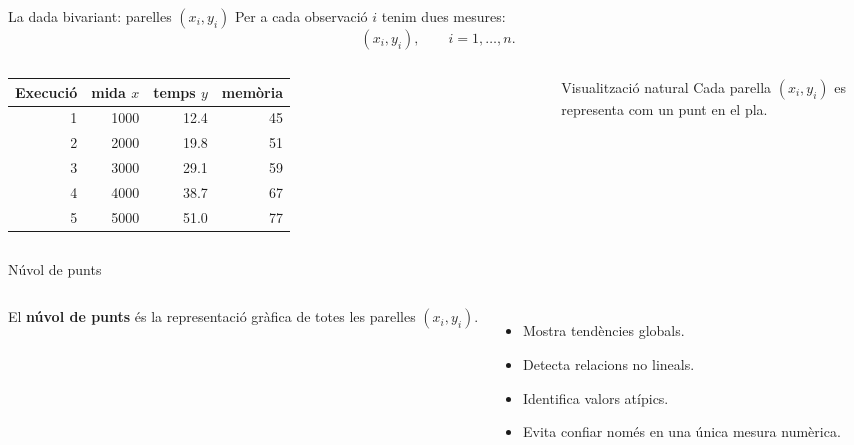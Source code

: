 \documentclass[10pt,aspectratio=169]{beamer}
\newcommand{\important}[1]{\textcolor{UABGreen}{\textbf{#1}}}
\begin{document}
\begin{frame}{La dada bivariant: parelles $(x_i,y_i)$}
Per a cada observació $i$ tenim dues mesures:
\[
 (x_i,y_i),\qquad i=1,\ldots,n.
\]
\vspace{0.2cm}
\begin{columns}[T]
\small
\begin{tabular}{rrrr}
\toprule
Execució & mida $x$ & temps $y$ & memòria \\
\midrule
1 & 1000 & 12.4 & 45 \\
2 & 2000 & 19.8 & 51 \\
3 & 3000 & 29.1 & 59 \\
4 & 4000 & 38.7 & 67 \\
5 & 5000 & 51.0 & 77 \\
\bottomrule
\end{tabular}
\begin{block}{Visualització natural}
Cada parella $(x_i,y_i)$ es representa com un punt en el pla.
\end{block}
\end{columns}
\end{frame}

\begin{frame}{Núvol de punts}
\begin{columns}[T]
El \important{núvol de punts} és la representació gràfica de totes les parelles $(x_i,y_i)$.
\vspace{0.2cm}
\begin{itemize}
  \item Mostra tendències globals.
  \item Detecta relacions no lineals.
  \item Identifica valors atípics.
  \item Evita confiar només en una única mesura numèrica.
\end{itemize}
\centering
{}
\end{columns}
\end{frame}
\end{document}
